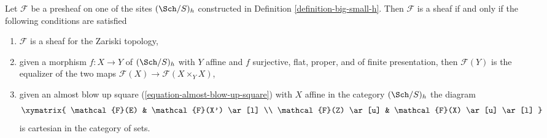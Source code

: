\begin{proposition}
\label{proposition-check-h}
Let $\mathcal{F}$ be a presheaf on one of the sites $(\Sch/S)_h$
constructed in Definition \ref{definition-big-small-h}.
Then $\mathcal{F}$ is a sheaf if and only if the following
conditions are satisfied
\begin{enumerate}
\item $\mathcal{F}$ is a sheaf for the Zariski topology,
\item given a morphism $f : X \to Y$ of $(\Sch/S)_h$ with $Y$ affine
and $f$ surjective, flat, proper, and of finite presentation, then
$\mathcal{F}(Y)$ is the equalizer of the two maps
$\mathcal{F}(X) \to \mathcal{F}(X \times_Y X)$,
\item given an almost blow up square (\ref{equation-almost-blow-up-square})
with $X$ affine in the category $(\Sch/S)_h$ the diagram
$$
\xymatrix{
\mathcal{F}(E) & \mathcal{F}(X') \ar[l] \\
\mathcal{F}(Z) \ar[u] & \mathcal{F}(X) \ar[u] \ar[l]
}
$$
is cartesian in the category of sets.
\end{enumerate}
\end{proposition}

